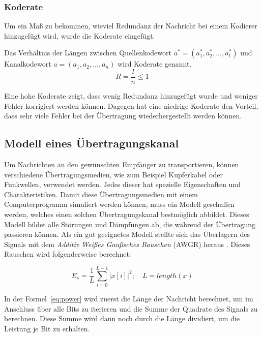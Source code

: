 \subsubsection{Koderate}
\label{sec:codeRate}
Um ein Maß zu bekommen, wieviel Redundanz der Nachricht bei einem Kodierer hinzugefügt wird, wurde die Koderate eingefügt.

\begin{t_def}
Das Verhältnis der Längen zwischen Quellenkodewort $a^*=(a^*_1,a^*_2,\dotsc,a^*_l)$ und Kanalkodewort $a=(a_1,a_2,\dotsc,a_n)$ wird Koderate genannt.
\begin{equation}
R = \frac{l}{n} \leq 1
\end{equation} 
\end{t_def} 

Eine hohe Koderate zeigt, dass wenig Redundanz hinzugefügt wurde und weniger Fehler korrigiert werden können. Dagegen hat eine niedrige Koderate den Vorteil, dass sehr viele Fehler bei der Übertragung wiederhergestellt werden können.~\cite[136]{schoenfeld2012informations} 

\subsection{Modell eines Übertragungskanal}
\label{sec:channels}
Um Nachrichten an den gewünschten Empfänger zu transportieren, können verschiedene Übertragungsmedien, wie zum Beispiel Kupferkabel oder Funkwellen, verwendet werden. Jedes dieser hat spezielle Eigenschaften und Charakteristiken. Damit diese Übertragungsmedien mit einem Computerprogramm simuliert werden können, muss ein Modell geschaffen werden, welches einen solchen Übertragungskanal bestmöglich abbildet. Dieses Modell bildet alle Störungen und Dämpfungen ab, die während der Übertragung passieren können. Als ein gut geeignetes Modell stellte sich das Überlagern des Signals mit dem \emph{Additiv Weißes Gaußsches Rauschen} (AWGR) heraus \cite[81]{schoenfeld2012informations}. Dieses Rauschen wird folgenderweise berechnet:

\begin{equation}
E_s = \frac{1}{L} \displaystyle\sum_{i=0}^{L-1} |x[i]|^2; \quad L = length(x)
\label{eq:power}
\end{equation}

In der Formel~\ref{eq:power} wird zuerst die Länge der Nachricht berechnet, um im Anschluss über alle Bits zu iterieren und die Summe der Quadrate des Signals zu berechnen. Diese Summe wird dann noch durch die Länge dividiert, um die Leistung je Bit zu erhalten.

